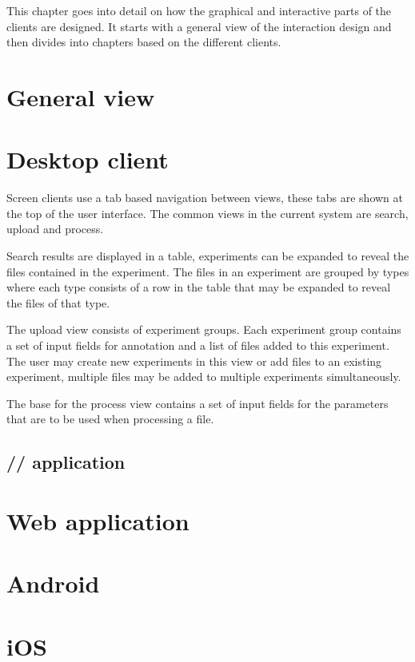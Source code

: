 
This chapter goes into detail on how the graphical and interactive parts of the clients are designed. It starts with a general view of the interaction design and then divides into chapters based on the different clients.

\section{General view}


\section{Desktop client}
Screen clients use a tab based navigation between views, these tabs are shown at the top of the user interface. The common views in the current system are search, upload and process.

Search results are displayed in a table, experiments can be expanded to reveal the files contained in the experiment. The files in an experiment are grouped by types where each type consists of a row in the table that may be expanded to reveal the files of that type.

The upload view consists of experiment groups. Each experiment group contains a set of input fields for annotation and a list of files added to this experiment. The user may create new experiments in this view or add files to an existing experiment, multiple files may be added to multiple experiments simultaneously.

The base for the process view contains a set of input fields for the parameters that are to be used when processing a file.

\FloatBarrier
\subsection{// application}


\FloatBarrier
\section{Web application}



\FloatBarrier
\section{Android}


\FloatBarrier
\section{iOS}

